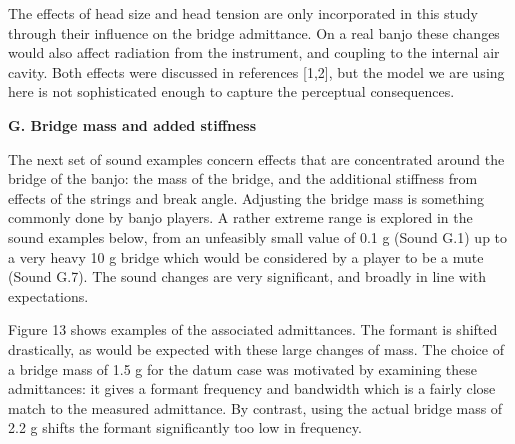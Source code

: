 \audio{}

\audio{}

\audio{}

\audio{}

\audio{}


  The effects of head size and head tension are only incorporated in this study 
  through their influence on the bridge admittance. On a real banjo these 
  changes would also affect radiation from the instrument, and coupling to the 
  internal air cavity. Both effects were discussed in references [1,2], but the 
  model we are using here is not sophisticated enough to capture the perceptual 
  consequences. 

  \textbf{G. Bridge mass and added stiffness} 

  The next set of sound examples concern effects that are concentrated around 
  the bridge of the banjo: the mass of the bridge, and the additional stiffness 
  from effects of the strings and break angle. Adjusting the bridge mass is 
  something commonly done by banjo players. A rather extreme range is explored 
  in the sound examples below, from an unfeasibly small value of 0.1 g (Sound 
  G.1) up to a very heavy 10 g bridge which would be considered by a player to 
  be a mute (Sound G.7). The sound changes are very significant, and broadly in 
  line with expectations. 

\audio{}

\audio{}

\audio{}

\audio{}

\audio{}

\audio{}

\audio{}

  Figure 13 shows examples of the associated admittances. The formant is 
  shifted drastically, as would be expected with these large changes of mass. 
  The choice of a bridge mass of 1.5 g for the datum case was motivated by 
  examining these admittances: it gives a formant frequency and bandwidth which 
  is a fairly close match to the measured admittance. By contrast, using the 
  actual bridge mass of 2.2 g shifts the formant significantly too low in 
  frequency. 


